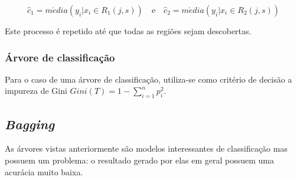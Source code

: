 \begin{equation}
\hat c_{1} = m\acute edia(y_{i} | x_{i} \in R_{1}(j,s)) \quad \textrm{e} \quad \hat c_{2} = m\acute edia(y_{i} | x_{i} \in R_{2}(j,s))
\end{equation} 

Este processo é repetido até que todas as regiões sejam descobertas.

\subsubsection{Árvore de classificação}

Para o caso de uma árvore de classificação, utiliza-se como critério de decisão a impureza de Gini\footnotemark {} \begin{math}Gini(T) = 1 - \sum_{i=1}^{n}{ p_{i}^{2}}\end{math}. 

\subsection{\emph{Bagging}}

As árvores vistas anteriormente são modelos interessantes de classificação mas possuem um problema: o resultado gerado por elas em geral possuem uma acurácia muito baixa.



